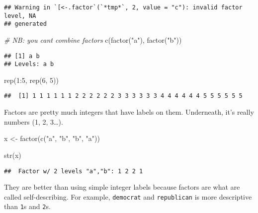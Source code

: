 \documentclass[
]{book}
\newenvironment{Shaded}{\begin{snugshade}}{\end{snugshade}}
\newcommand{\CommentTok}[1]{\textcolor[rgb]{0.56,0.35,0.01}{\textit{#1}}}
\newcommand{\DecValTok}[1]{\textcolor[rgb]{0.00,0.00,0.81}{#1}}
\newcommand{\FunctionTok}[1]{\textcolor[rgb]{0.00,0.00,0.00}{#1}}
\newcommand{\NormalTok}[1]{#1}
\newcommand{\OtherTok}[1]{\textcolor[rgb]{0.56,0.35,0.01}{#1}}
\newcommand{\SpecialCharTok}[1]{\textcolor[rgb]{0.00,0.00,0.00}{#1}}
\newcommand{\StringTok}[1]{\textcolor[rgb]{0.31,0.60,0.02}{#1}}
\begin{document}
\begin{verbatim}
## Warning in `[<-.factor`(`*tmp*`, 2, value = "c"): invalid factor level, NA
## generated
\end{verbatim}

\begin{Shaded}
\begin{Highlighting}[]
\CommentTok{\# NB: you can\textquotesingle{}t combine factors}
\FunctionTok{c}\NormalTok{(}\FunctionTok{factor}\NormalTok{(}\StringTok{"a"}\NormalTok{), }\FunctionTok{factor}\NormalTok{(}\StringTok{"b"}\NormalTok{))}
\end{Highlighting}
\end{Shaded}

\begin{verbatim}
## [1] a b
## Levels: a b
\end{verbatim}

\begin{Shaded}
\begin{Highlighting}[]
\FunctionTok{rep}\NormalTok{(}\DecValTok{1}\SpecialCharTok{:}\DecValTok{5}\NormalTok{, }\FunctionTok{rep}\NormalTok{(}\DecValTok{6}\NormalTok{, }\DecValTok{5}\NormalTok{))}
\end{Highlighting}
\end{Shaded}

\begin{verbatim}
##  [1] 1 1 1 1 1 1 2 2 2 2 2 2 3 3 3 3 3 3 4 4 4 4 4 4 5 5 5 5 5 5
\end{verbatim}

Factors are pretty much integers that have labels on them. Underneath, it's really numbers (1, 2, 3\ldots).

\begin{Shaded}
\begin{Highlighting}[]
\NormalTok{x }\OtherTok{\textless{}{-}} \FunctionTok{factor}\NormalTok{(}\FunctionTok{c}\NormalTok{(}\StringTok{"a"}\NormalTok{, }\StringTok{"b"}\NormalTok{, }\StringTok{"b"}\NormalTok{, }\StringTok{"a"}\NormalTok{))}

\FunctionTok{str}\NormalTok{(x)}
\end{Highlighting}
\end{Shaded}

\begin{verbatim}
##  Factor w/ 2 levels "a","b": 1 2 2 1
\end{verbatim}

They are better than using simple integer labels because factors are what are called self-describing. For example, \texttt{democrat} and \texttt{republican} is more descriptive than \texttt{1}s and \texttt{2}s.
\end{document}
